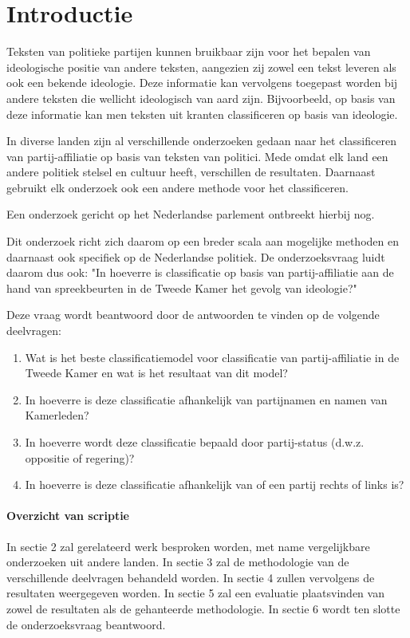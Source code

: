\section{Introductie}
\label{sec:intro}
Teksten van politieke partijen kunnen bruikbaar zijn voor het bepalen van ideologische positie van andere teksten, aangezien zij zowel een tekst leveren als ook een bekende ideologie. Deze informatie kan vervolgens toegepast worden bij andere teksten die wellicht ideologisch van aard zijn. Bijvoorbeeld, op basis van deze informatie kan men teksten uit kranten classificeren op basis van ideologie\cite{DBLP:journals/corr/Biessmann16,Hirst_textto}.\par
In diverse landen zijn al verschillende onderzoeken gedaan naar het classificeren van partij-affiliatie op basis van teksten van politici\cite{Ferreira2016UsingTT,DBLP:journals/corr/Biessmann16}. Mede omdat elk land een andere politiek stelsel en cultuur heeft, verschillen de resultaten. Daarnaast gebruikt elk onderzoek ook een andere methode voor het classificeren. \par
Een onderzoek gericht op het Nederlandse parlement ontbreekt hierbij nog. \par
Dit onderzoek richt zich daarom op een breder scala aan mogelijke methoden en daarnaast ook specifiek op de Nederlandse politiek. De onderzoeksvraag luidt daarom dus ook: "In hoeverre is classificatie op basis van partij-affiliatie aan de hand van spreekbeurten in de Tweede Kamer het gevolg van ideologie?"\par
Deze vraag wordt beantwoord door de antwoorden te vinden op de volgende deelvragen:
\begin{enumerate}
    \item Wat is het beste classificatiemodel voor classificatie van partij-affiliatie in de Tweede Kamer en wat is het resultaat van dit model?
    \item In hoeverre is deze classificatie afhankelijk van partijnamen en namen van Kamerleden?
    \item In hoeverre wordt deze classificatie bepaald door partij-status (d.w.z. oppositie of regering)?
    \item In hoeverre is deze classificatie afhankelijk van of een partij rechts of links is?
\end{enumerate}


\paragraph{Overzicht van scriptie}
In sectie 2 zal gerelateerd werk besproken worden, met name vergelijkbare onderzoeken uit andere landen. In sectie 3 zal de methodologie van de verschillende deelvragen behandeld worden. In sectie 4 zullen vervolgens de resultaten weergegeven worden. In sectie 5 zal een evaluatie plaatsvinden van zowel de resultaten als de gehanteerde methodologie. In sectie 6 wordt ten slotte de onderzoeksvraag beantwoord.
